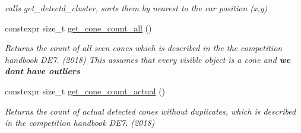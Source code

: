 \begin{DoxyCompactItemize}
\begin{DoxyCompactList}\small\item\em calls get\+\_\+detectd\+\_\+cluster, sorts them by nearest to the car position (x,y) \end{DoxyCompactList}\item 
constexpr size\+\_\+t \hyperlink{classclara_1_1data__association_a0107c7f137ed245fec1818aa9c7f63d5}{get\+\_\+cone\+\_\+count\+\_\+all} ()
\begin{DoxyCompactList}\small\item\em Returns the count of all seen cones which is described in the the competition handbook D\+E7. (2018) This assumes that every visible object is a cone and {\bfseries we don\textquotesingle{}t have outliers} \end{DoxyCompactList}\item 
\mbox{\label{classclara_1_1data__association_a8d662633442073068680426a9e2509e1}} 
constexpr size\+\_\+t \hyperlink{classclara_1_1data__association_a8d662633442073068680426a9e2509e1}{get\+\_\+cone\+\_\+count\+\_\+actual} ()
\begin{DoxyCompactList}\small\item\em Returns the count of actual detected cones without duplicates, which is described in the competition handbook D\+E7. (2018) \end{DoxyCompactList}\end{DoxyCompactItemize}
